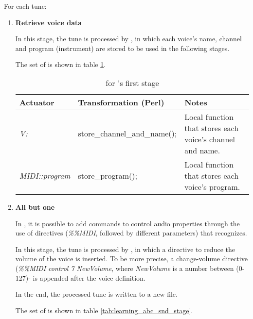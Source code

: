 For each tune:
\begin{enumerate}
  \item \textbf{Retrieve voice data}

  In this stage, the tune is processed by \dt{}, in which each voice's name, channel and program
  (instrument) are stored to be used in the following stages.

  The set of \abcdtrules{} is shown in table \ref{tab:learning_abc_fst_stage}.

  \begin{center}
    \begin{table}[h]
      \begin{tabular}{|p{3cm}|p{5cm}|p{7.5cm}|}
        \hline
        Actuator & Transformation (Perl) & Notes\\
        \hline
        \hline
        \emph{V:} & store\_channel\_and\_name(); & Local function that stores each voice's channel
        and name.
        \\
        \hline

        \hline
        \emph{MIDI::program} & store\_program(); & Local function that stores each voice's program.
        \\
        \hline
      \end{tabular}
      \caption{\abcdtrules{} for \learningabc{}'s first stage}
      \label{tab:learning_abc_fst_stage}
    \end{table}
  \end{center}

  \item \textbf{All but one}

  In \abc{}, it is possible to add commands to control audio properties through the use of \midi{}
  directives (\emph{\%\%MIDI}, followed by different parameters) that \abctomidi{} recognizes.

  In this stage, the tune is processed by \dt{}, in which a \midi{} directive to reduce the volume
  of the voice is inserted. To be more precise, a change-volume \midi{} directive (\emph{\%\%MIDI
  control 7 NewVolume}, where \emph{NewVolume} is a number between (0-127)- is appended after the
  voice definition.

  In the end, the processed tune is written to a new \abc{} file.

  The set of \abcdtrules{} is shown in table \ref{tab:learning_abc_snd_stage}.


\end{enumerate}
